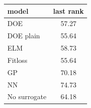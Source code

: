 \begin{tabular}{|lc|}
\hline
model & last rank\\
\hline
DOE & 57.27 \\
DOE plain & 55.64 \\
ELM & 58.73 \\
Fitloss & 55.64 \\
GP & 70.18 \\
NN & 74.73 \\
No surrogate & 64.18 \\
\hline
\end{tabular}
